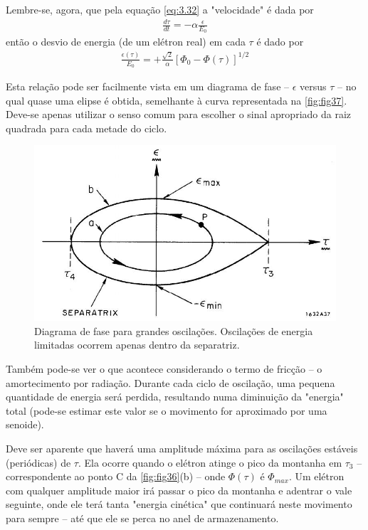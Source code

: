 Lembre-se, agora, que pela equação \eqref{eq:3.32} a "velocidade" é dada por
\begin{align*}
	\frac{d\tau}{dt} = -\alpha \frac{\epsilon}{E_0}
\end{align*}
então o desvio de energia (de um elétron real) em cada $\tau$ é dado por
\begin{align}
	\frac{\epsilon(\tau)}{E_0} = + \frac{\sqrt{2}}{\alpha}[\Phi_0-\Phi(\tau)]^{1/2}\label{eq:3.56}
\end{align}

Esta relação pode ser facilmente vista em um diagrama de fase -- $\epsilon$ versus $\tau$ -- no qual quase uma elipse é obtida, semelhante à curva representada na \autoref{fig:fig37}. Deve-se apenas utilizar o senso comum para escolher o sinal apropriado da raiz quadrada para cada metade do ciclo.

\begin{figure}[!htb]
	\centering
	\includegraphics[width=0.7\linewidth]{./Figuras/fig37.jpeg}
	\caption{Diagrama de fase para grandes oscilações. Oscilações de energia limitadas ocorrem apenas dentro da separatriz.}
	\label{fig:fig37}
\end{figure}

Também pode-se ver o que acontece considerando o termo de fricção -- o amortecimento por radiação. Durante cada ciclo de oscilação, uma pequena quantidade de energia será perdida, resultando numa diminuição da "energia" total (pode-se estimar este valor se o movimento for aproximado por uma senoide).

Deve ser aparente que haverá uma amplitude máxima para as oscilações estáveis (periódicas) de $\tau$. Ela ocorre quando o elétron atinge o pico da montanha em $\tau_3$ -- correspondente ao ponto C da \autoref{fig:fig36}(b) -- onde $\Phi(\tau)$ é $\Phi_{max}$. Um elétron com qualquer amplitude maior irá passar o pico da montanha e adentrar o vale seguinte, onde ele terá tanta "energia cinética" que continuará neste movimento para sempre -- até que ele se perca no anel de armazenamento.

